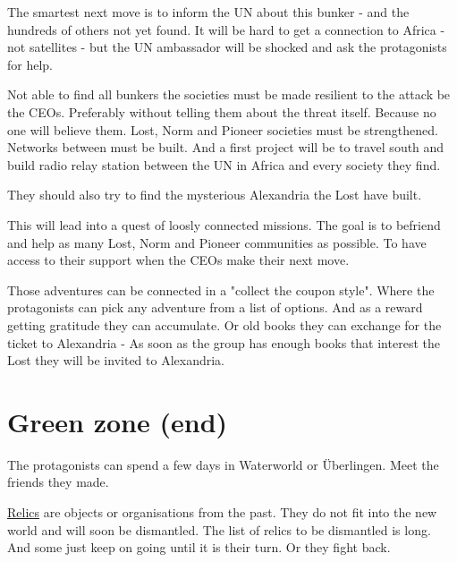 The smartest next move is to inform the UN about this bunker - and the hundreds of others not yet found. It will be hard to get a connection to Africa - not satellites - but the UN ambassador will be shocked and ask the protagonists for help.

Not able to find all bunkers the societies must be made resilient to the attack be the CEOs. Preferably without telling them about the threat itself. Because no one will believe them. Lost, Norm and Pioneer societies must be strengthened. Networks between must be built. And a first project will be to travel south and build radio relay station between the UN in Africa and every society they find.

They should also try to find the mysterious Alexandria the Lost have built.

This will lead into a quest of loosly connected missions. The goal is to befriend and help as many Lost, Norm and Pioneer communities as possible. To have access to their support when the CEOs make their next move.

Those adventures can be connected in a "collect the coupon style". Where the protagonists can pick any adventure from a list of options. And as a reward getting gratitude they can accumulate. Or old books they can exchange for the ticket to Alexandria - As soon as the group has enough books that interest the Lost they will be invited to Alexandria.

\section{Green zone (end)}

The protagonists can spend a few days in Waterworld or Überlingen. Meet the friends they made.













\begin{sidebarBox}[title=Relics]
\hyperref[sec:Relic]{Relics} are objects or organisations from the past. They do not fit into the new world and will soon be dismantled. The list of relics to be dismantled is long. And some just keep on going until it is their turn. Or they fight back.
\end{sidebarBox}




\label{ch:Label name}

